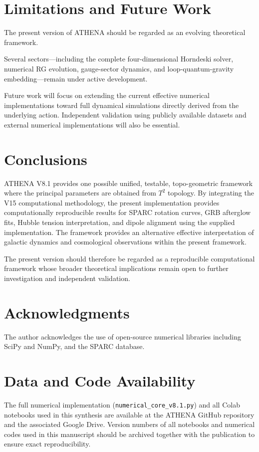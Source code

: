 \documentclass[12pt,a4paper]{article}
\numberwithin{equation}{section}
\begin{document}
\section{Limitations and Future Work}

The present version of ATHENA should be regarded as an evolving theoretical framework.

Several sectors—including the complete four-dimensional Horndeski solver, numerical RG evolution, gauge-sector dynamics, and loop-quantum-gravity embedding—remain under active development.

Future work will focus on extending the current effective numerical implementations toward full dynamical simulations directly derived from the underlying action. Independent validation using publicly available datasets and external numerical implementations will also be essential.

\section{Conclusions}

ATHENA V8.1 provides one possible unified, testable, topo-geometric framework where the principal parameters are obtained from $T^2$ topology. By integrating the V15 computational methodology, the present implementation provides computationally reproducible results for SPARC rotation curves, GRB afterglow fits, Hubble tension interpretation, and dipole alignment using the supplied implementation. The framework provides an alternative effective interpretation of galactic dynamics and cosmological observations within the present framework.

The present version should therefore be regarded as a reproducible computational framework whose broader theoretical implications remain open to further investigation and independent validation.

\section*{Acknowledgments}
The author acknowledges the use of open-source numerical libraries including SciPy and NumPy, and the SPARC database.

\section*{Data and Code Availability}
The full numerical implementation (\texttt{numerical\_core\_v8.1.py}) and all Colab notebooks used in this synthesis are available at the ATHENA GitHub repository and the associated Google Drive. Version numbers of all notebooks and numerical codes used in this manuscript should be archived together with the publication to ensure exact reproducibility.
\end{document}
